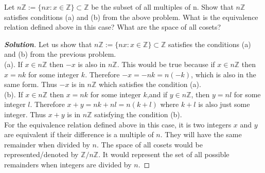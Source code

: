 \documentclass[11pt]{article}
\newenvironment{problem}[2][Problem\!]{\begin{trivlist}
\item[\hskip \labelsep {\bfseries #1}\hskip \labelsep {\bfseries #2.}]}{\end{trivlist}}
\newenvironment{solution}{\begin{proof}[\textbf{\textit{Solution}}]}{\end{proof}}
\newcommand{\zz}{\mathbb Z}   %
\begin{document}
\begin{problem}{7.3}
Let \(n\zz:= \{nx: x \in \zz\} \subset \zz\) be the subset of all multiples of n. Show that \(n\zz\) satisfies conditions (a) and (b) from the above problem. What is the equivalence relation defined above in this case? What are the space of all cosets?
\begin{solution}
Let us show that \(n\zz:= \{nx: x \in \zz\} \subset \zz\) satisfies the conditions (a) and (b) from the previous problem.\\
(a). If \(x \in n\zz\) then \(-x\) is also in \(n\zz\). This would be true because if \(x \in n\zz\) then \(x = nk\) for some integer \(k\). Therefore \(-x = -nk = n(-k)\), which is also in the same form.  Thus \(-x\) is in \(n\zz\) which satisfies the condition (a).\\
(b). If \(x \in n\zz\) then \(x = nk\) for some integer \(k\),and if \(y \in n\zz\), then \(y = nl\) for some integer \(l\). Therefore \(x+y = nk+nl = n(k+l)\) where \(k+l\) is also just some integer. Thus \(x+y\) is in \(n\zz\) satisfying the condition (b).\\
For the equivalence relation defined above in this case, it is two integers \(x\) and \(y\) are equivalent if their difference is a multiple of \(n\). They will have the same remainder when divided by \(n\). The space of all cosets would be represented/denoted by \(\zz/n\zz\). It would represent the set of all possible remainders when integers are divided by \(n\).
\end{solution}


\end{problem}

\newpage  %
\end{document}
